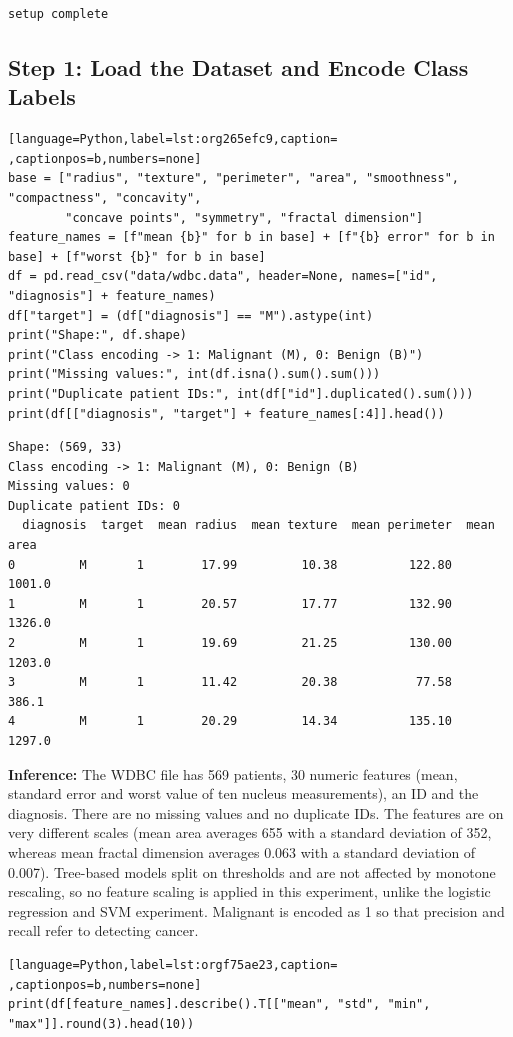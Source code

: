\documentclass[11pt]{article}
\begin{document}
\begin{verbatim}
setup complete
\end{verbatim}

\subsection*{Step 1: Load the Dataset and Encode Class Labels}
\label{sec:org6f8a5f2}

\begin{lstlisting}[language=Python,label=lst:org265efc9,caption= ,captionpos=b,numbers=none]
base = ["radius", "texture", "perimeter", "area", "smoothness", "compactness", "concavity",
        "concave points", "symmetry", "fractal dimension"]
feature_names = [f"mean {b}" for b in base] + [f"{b} error" for b in base] + [f"worst {b}" for b in base]
df = pd.read_csv("data/wdbc.data", header=None, names=["id", "diagnosis"] + feature_names)
df["target"] = (df["diagnosis"] == "M").astype(int)
print("Shape:", df.shape)
print("Class encoding -> 1: Malignant (M), 0: Benign (B)")
print("Missing values:", int(df.isna().sum().sum()))
print("Duplicate patient IDs:", int(df["id"].duplicated().sum()))
print(df[["diagnosis", "target"] + feature_names[:4]].head())
\end{lstlisting}

\begin{verbatim}
Shape: (569, 33)
Class encoding -> 1: Malignant (M), 0: Benign (B)
Missing values: 0
Duplicate patient IDs: 0
  diagnosis  target  mean radius  mean texture  mean perimeter  mean area
0         M       1        17.99         10.38          122.80     1001.0
1         M       1        20.57         17.77          132.90     1326.0
2         M       1        19.69         21.25          130.00     1203.0
3         M       1        11.42         20.38           77.58      386.1
4         M       1        20.29         14.34          135.10     1297.0
\end{verbatim}

\textbf{Inference:} The WDBC file has 569 patients, 30 numeric features (mean, standard error and worst value of
ten nucleus measurements), an ID and the diagnosis. There are no missing values and no
duplicate IDs. The features are on very different scales (mean area averages 655 with a
standard deviation of 352, whereas mean fractal dimension averages 0.063 with a standard
deviation of 0.007). Tree-based models split on thresholds and are not affected by monotone
rescaling, so no feature scaling is applied in this experiment, unlike the logistic
regression and SVM experiment. Malignant is encoded as 1 so that precision and recall refer
to detecting cancer.
\begin{lstlisting}[language=Python,label=lst:orgf75ae23,caption= ,captionpos=b,numbers=none]
print(df[feature_names].describe().T[["mean", "std", "min", "max"]].round(3).head(10))
\end{lstlisting}
\end{document}
